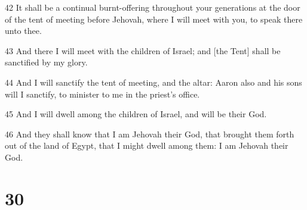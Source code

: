 \par 42 It shall be a continual burnt-offering throughout your generations at the door of the tent of meeting before Jehovah, where I will meet with you, to speak there unto thee.
\par 43 And there I will meet with the children of Israel; and [the Tent] shall be sanctified by my glory.
\par 44 And I will sanctify the tent of meeting, and the altar: Aaron also and his sons will I sanctify, to minister to me in the priest's office.
\par 45 And I will dwell among the children of Israel, and will be their God.
\par 46 And they shall know that I am Jehovah their God, that brought them forth out of the land of Egypt, that I might dwell among them: I am Jehovah their God.

\chapter{30}

